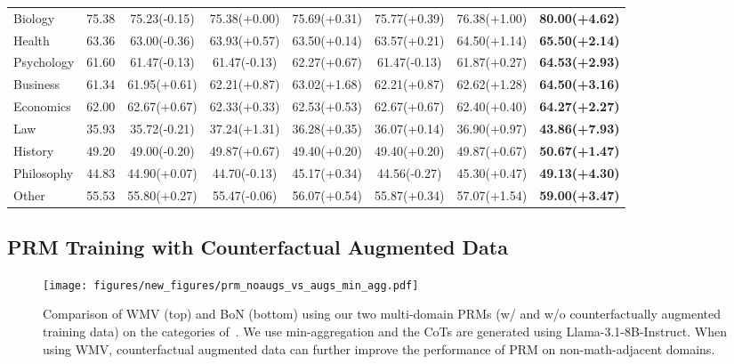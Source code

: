 \begin{table*}[ht]
{\begin{tabular}{l|c|cccccc}
\midrule
Biology & 75.38 & 75.23(-0.15) & 75.38(+0.00) & 75.69(+0.31) & 75.77(+0.39) & 76.38(+1.00) & \textbf{80.00(+4.62)} \\
Health & 63.36 & 63.00(-0.36) & 63.93(+0.57) & 63.50(+0.14) & 63.57(+0.21) & 64.50(+1.14) & \textbf{65.50(+2.14)} \\
Psychology & 61.60 & 61.47(-0.13) & 61.47(-0.13) & 62.27(+0.67) & 61.47(-0.13) & 61.87(+0.27) & \textbf{64.53(+2.93)} \\
Business & 61.34 & 61.95(+0.61) & 62.21(+0.87) & 63.02(+1.68) & 62.21(+0.87) & 62.62(+1.28) & \textbf{64.50(+3.16)} \\
Economics & 62.00 & 62.67(+0.67) & 62.33(+0.33) & 62.53(+0.53) & 62.67(+0.67) & 62.40(+0.40) & \textbf{64.27(+2.27)} \\
Law & 35.93 & 35.72(-0.21) & 37.24(+1.31) & 36.28(+0.35) & 36.07(+0.14) & 36.90(+0.97) & \textbf{43.86(+7.93)} \\
History & 49.20 & 49.00(-0.20) & 49.87(+0.67) & 49.40(+0.20) & 49.40(+0.20) & 49.87(+0.67) & \textbf{50.67(+1.47)} \\
Philosophy & 44.83 & 44.90(+0.07) & 44.70(-0.13) & 45.17(+0.34) & 44.56(-0.27) & 45.30(+0.47) & \textbf{49.13(+4.30)} \\
Other & 55.53 & 55.80(+0.27) & 55.47(-0.06) & 56.07(+0.54) & 55.87(+0.34) & 57.07(+1.54) & \textbf{59.00(+3.47)} \\
\bottomrule
\end{tabular}
}
\vskip -0.1in
\label{tab:math_prm_on_multi_domain}
\end{table*}


\subsection{PRM Training with Counterfactual Augmented Data}

\begin{figure*}[ht]
    \begin{center}
        \texttt{[image: figures/new\_figures/prm\_noaugs\_vs\_augs\_min\_agg.pdf]}        
        \caption{Comparison of WMV (top) and BoN (bottom) using our two multi-domain PRMs (w/ and w/o counterfactually augmented training data) on the categories of~\ourdataeval. We use min-aggregation and the CoTs are generated using Llama-3.1-8B-Instruct. When using WMV, counterfactual augmented data can further improve the performance of PRM on non-math-adjacent domains.}
        \label{fig:counteraug}
    \end{center}
\end{figure*}


